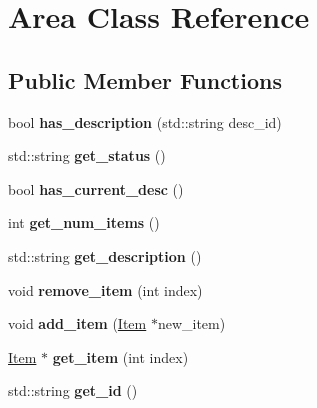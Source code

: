 \hypertarget{class_area}{
\section{Area Class Reference}
\label{class_area}
}
\subsection*{Public Member Functions}
\begin{DoxyCompactItemize}
\item 
\hypertarget{class_area_a928ac4f85119316a126beafc575a5f84}{
bool {\bfseries has\_\-description} (std::string desc\_\-id)}
\label{class_area_a928ac4f85119316a126beafc575a5f84}

\item 
\hypertarget{class_area_ac3f89059fe2ef23610dc3a5650c94c0d}{
std::string {\bfseries get\_\-status} ()}
\label{class_area_ac3f89059fe2ef23610dc3a5650c94c0d}

\item 
\hypertarget{class_area_a7a2701d4527e084ea7f8944925b539d7}{
bool {\bfseries has\_\-current\_\-desc} ()}
\label{class_area_a7a2701d4527e084ea7f8944925b539d7}

\item 
\hypertarget{class_area_aee8135f25247d5e06dc0b28bf8cabcba}{
int {\bfseries get\_\-num\_\-items} ()}
\label{class_area_aee8135f25247d5e06dc0b28bf8cabcba}

\item 
\hypertarget{class_area_acab405d06547438ee02b3d8b9a2ff013}{
std::string {\bfseries get\_\-description} ()}
\label{class_area_acab405d06547438ee02b3d8b9a2ff013}

\item 
\hypertarget{class_area_a687234da51ac6da40d2aee426926dfcd}{
void {\bfseries remove\_\-item} (int index)}
\label{class_area_a687234da51ac6da40d2aee426926dfcd}

\item 
\hypertarget{class_area_a8f4693277743a9dbc6ac0212fc02c86f}{
void {\bfseries add\_\-item} (\hyperlink{class_item}{Item} $\ast$new\_\-item)}
\label{class_area_a8f4693277743a9dbc6ac0212fc02c86f}

\item 
\hypertarget{class_area_a11b2c96e1abfc4146e6d8c2a8da83d34}{
\hyperlink{class_item}{Item} $\ast$ {\bfseries get\_\-item} (int index)}
\label{class_area_a11b2c96e1abfc4146e6d8c2a8da83d34}

\item 
\hypertarget{class_area_a19d6622fb6fb95f6ba5fb212e26728e6}{
std::string {\bfseries get\_\-id} ()}
\label{class_area_a19d6622fb6fb95f6ba5fb212e26728e6}


\end{DoxyCompactItemize}
